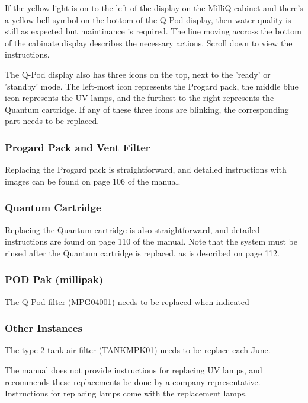 \documentclass[12pt]{../SOP3_beta}\usepackage[]{graphicx}\usepackage[]{color}
\begin{document}
\NP If the yellow light is on to the left of the display on the MilliQ cabinet and there's a yellow bell symbol on the bottom of the Q-Pod display, then water quality is still as expected but maintinance is required. The line moving accross the bottom of the cabinate display describes the necessary actions. Scroll down to view the instructions. 

\NP The Q-Pod display also has three icons on the top, next to the 'ready' or 'standby' mode. The left-most icon represents the Progard pack, the middle blue icon represents the UV lamps, and the furthest to the right represents the Quantum cartridge. If any of these three icons are blinking, the corresponding part needs to be replaced.

\subsubsection{Progard Pack and Vent Filter}

\NP Replacing the Progard pack is straightforward, and detailed instructions with images can be found on page 106 of the manual.

\subsubsection{Quantum Cartridge}

\NP Replacing the Quantum cartridge is also straightforward, and detailed instructions are found on page 110 of the manual. Note that the system must be rinsed after the Quantum cartridge is replaced, as is described on page 112. 

\subsubsection{POD Pak (millipak)}

\NP The Q-Pod filter (MPG04001) needs to be replaced when indicated

\subsubsection{Other Instances}

\NP The type 2 tank air filter (TANKMPK01) needs to be replace each June. 

\NP The manual does not provide instructions for replacing UV lamps, and recommends these replacements be done by a company representative. Instructions for replacing lamps come with the replacement lamps.
\end{document}

